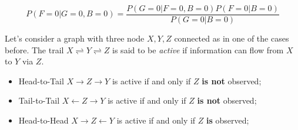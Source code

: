 \[P(F=0\vert G=0, B=0)=\dfrac{P(G=0\vert F=0,B=0)P(F=0\vert B=0)}{P(G=0\vert B=0)}\]
\begin{definition}
  Let's consider a graph with three node $X,Y,Z$ connected as in one of the cases before. The trail $X\rightleftharpoons Y\rightleftharpoons Z$ is said to be \textit{active} if information can flow from $X$ to $Y$ via $Z$.
  \begin{itemize}
    \item Head-to-Tail $X\rightarrow Z\rightarrow Y$ is active if and only if $Z$ \textbf{is not} observed;
    \item Tail-to-Tail $X\leftarrow Z\rightarrow Y$ is active if and only if $Z$ \textbf{is not} observed;
    \item Head-to-Head $X\rightarrow Z\leftarrow Y$ is active if and only if $Z$ \textbf{is} observed;
  \end{itemize}
\end{definition}
%
%
